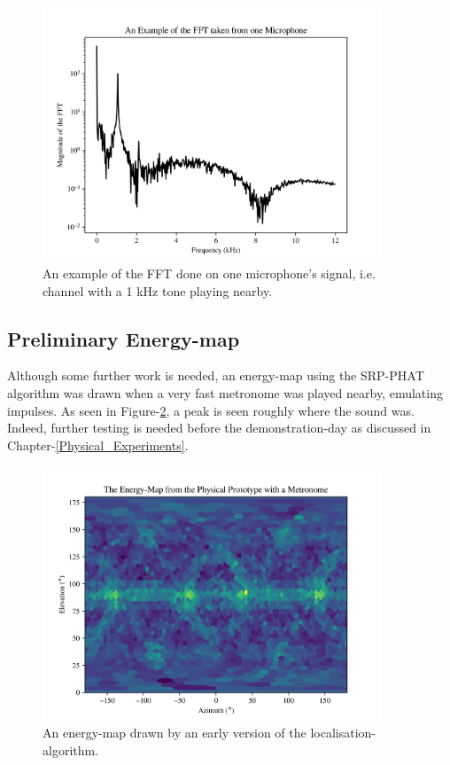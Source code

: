 \documentclass[notitlepage]{report}
\begin{document}
\begin{figure}[H]
\includegraphics[width=0.9\textwidth]{../Python/main_method/physical/fft.png}
\centering
\caption{An example of the FFT done on one microphone's signal, i.e. channel with a 1 \si{kHz} tone playing nearby.}
\label{fig:testing_fft}
\centering
\end{figure}

\subsection{Preliminary Energy-map}

Although some further work is needed, an energy-map using the SRP-PHAT algorithm was drawn when a very fast metronome was played nearby, emulating impulses. As seen in Figure-\ref{fig:testing_map}, a peak is seen roughly where the sound was. Indeed, further testing is needed before the demonstration-day as discussed in Chapter-\ref{Physical_Experiments}.

\begin{figure}[H]
\includegraphics[width=0.9\textwidth]{../Python/main_method/physical/map.png}
\centering
\caption{An energy-map drawn by an early version of the localisation-algorithm.}
\label{fig:testing_map}
\centering
\end{figure}
\end{document}

